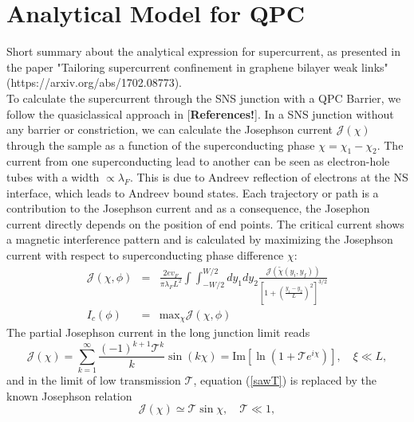 \documentclass[a4paper]{article}
\begin{document}
\section{Analytical Model for QPC}

Short summary about the analytical expression for supercurrent, as presented in the paper "Tailoring supercurrent
confinement in graphene bilayer weak links" (https://arxiv.org/abs/1702.08773). \\
To calculate the supercurrent through the SNS junction with a QPC Barrier, we follow the quasiclassical approach in [\textbf{References!}].
In a SNS junction without any barrier or constriction, we can calculate the Josephson current $\mathcal{J}\left( \chi \right)$ through the sample as a function of the superconducting phase $\chi = \chi_1 - \chi_2$. The current from one superconducting lead to another can be seen as electron-hole tubes with a width $\propto \lambda_F$. This is due to Andreev reflection of electrons at the NS interface, which leads to Andreev bound states. Each trajectory or path is a contribution to the Josephson current and as a consequence, the Josephon current directly depends on the position of end points. The critical current shows a magnetic interference pattern and is calculated by maximizing the Josephson current with respect to superconducting phase difference $\chi$:
\begin{eqnarray}
\mathcal{J}\left(\chi, \phi\right) &=& \frac{2ev_F}{\pi \lambda_F L^2} \int \int _{-W/2}^{W/2} dy_1 dy_2 \frac{\mathcal{J}\left(\tilde{\chi}(y_i,y_f)\right)}{\left[ 1 + \left(\frac{y_1 - y_2}{L}\right)^2 \right]^{3/2}} \\
I_c\left(\phi\right) &=& \text{max}_{\chi} \mathcal{J}\left(\chi, \phi\right)
\end{eqnarray}
The partial Josephson current in the long junction limit reads
\begin{equation}
\mathcal{J}(\chi)=\sum_{k=1}^\infty \frac{(-1)^{k+1} \mathcal{T}^k}{k} \sin(k \chi)
=\text{Im}\left[ \ln\left(1+\mathcal{T} e^{i \chi}\right)\right], \quad  \xi\ll L,
\label{sawT}
\end{equation}
and in the limit of low transmission $\mathcal{T}$, equation (\ref{sawT}) is replaced by the known Josephson relation
\begin{equation}
\mathcal{J}(\chi)\simeq  \mathcal{T} \sin\chi, \quad \mathcal{T}\ll 1,
\label{sawT<1}
\end{equation}
\end{document}
